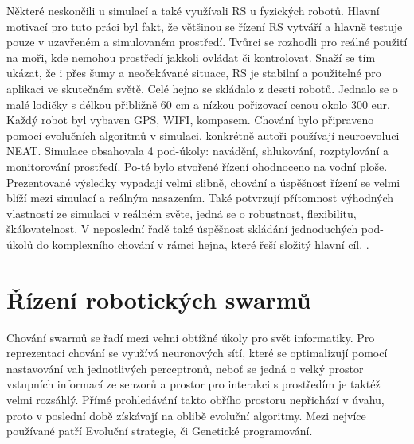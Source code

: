 Některé neskončili u simulací a také využívali RS u fyzických robotů. Hlavní motivací pro tuto práci byl fakt, že většinou se řízení RS vytváří  a hlavně testuje pouze v uzavřeném a simulovaném prostředí. Tvůrci se rozhodli pro reálné použití na moři, kde nemohou prostředí jakkoli ovládat či kontrolovat. Snaží se tím ukázat, že i přes šumy a neočekávané situace, RS je stabilní a použitelné pro aplikaci ve skutečném světě. Celé hejno se skládalo z deseti robotů. Jednalo se o malé lodičky s délkou přibližně 60 cm a nízkou pořizovací cenou okolo 300 eur. Každý robot byl  vybaven GPS, WIFI, kompasem. Chování bylo připraveno pomocí evolučních algoritmů v simulaci, konkrétně autoři používají neuroevoluci NEAT. Simulace obsahovala 4 pod-úkoly: navádění, shlukování, rozptylování a monitorování prostředí. Po-té bylo stvořené řízení ohodnoceno na vodní ploše. Prezentované výsledky vypadají velmi slibně, chování a úspěšnost řízení se velmi blíží mezi simulací a reálným nasazením. Také potvrzují přítomnost výhodných vlastností ze simulaci v reálném světe, jedná se o robustnost, flexibilitu, škálovatelnost. V neposlední řadě také úspěšnost skládání jednoduchých pod-úkolů do komplexního chování v rámci hejna, které řeší složitý hlavní cíl.  \citep{aquaticRobots}. 
\section{Řízení robotických swarmů}
Chování swarmů se řadí mezi velmi obtížné úkoly pro svět informatiky. Pro reprezentaci chování se využívá neuronových sítí, které se optimalizují pomocí nastavování vah jednotlivých perceptronů, neboť se jedná o velký prostor vstupních informací ze senzorů a prostor pro interakci s prostředím je taktéž velmi rozsáhlý. Přímé prohledávání takto obřího prostoru nepřichází v úvahu, proto v poslední době získávají na oblibě evoluční algoritmy. Mezi nejvíce používané patří Evoluční strategie, či Genetické programování. \par 

